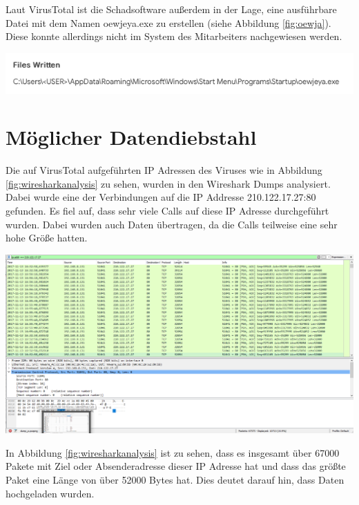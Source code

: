 Laut VirusTotal ist die Schadsoftware außerdem in der Lage, eine ausführbare Datei mit dem Namen oewjeya.exe zu erstellen (siehe Abbildung \ref{fig:oewja}).
Diese konnte allerdings nicht im System des Mitarbeiters nachgewiesen werden.

\begin{center}
	\includegraphics[width=15.8cm]{figures/oewja.png}
	\label{fig:oewja}
\end{center}

\chapter{Möglicher Datendiebstahl}
\label{ch:Datendiebstahl}
Die auf VirusTotal aufgeführten IP Adressen des Viruses wie in Abbildung \ref{fig:wiresharkanalysis} zu sehen, wurden in den Wireshark Dumps analysiert. Dabei wurde eine der Verbindungen auf die IP Addresse 210.122.17.27:80 gefunden. Es fiel auf, dass sehr viele Calls auf diese IP Adresse durchgeführt wurden. Dabei wurden auch Daten übertragen, da die Calls teilweise eine sehr hohe Größe hatten.

\begin{center}
	\includegraphics[width=15.8cm]{figures/wiresharkanalysis.png}
	\label{fig:wiresharkanalysis}
\end{center}

In Abbildung \ref{fig:wiresharkanalysis} ist zu sehen, dass es insgesamt über 67000 Pakete mit Ziel oder Absenderadresse dieser IP Adresse hat und dass das größte Paket eine Länge von über 52000 Bytes hat. Dies deutet darauf hin, dass Daten hochgeladen wurden.

